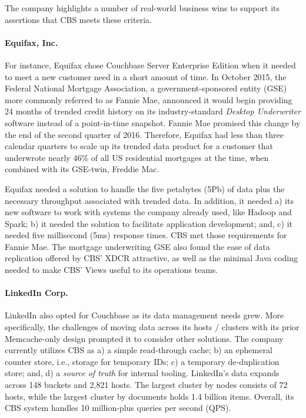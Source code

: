 \documentclass[9pt,twocolumn,twoside]{styles/osajnl}
\begin{document}
The company highlights a number of real-world business wins to support its
assertions that CBS meets these criteria.

\paragraph{Equifax, Inc.}
For instance, Equifax chose Couchbase
Server Enterprise Edition when it needed to meet a new customer need in a short
amount of time.  In October 2015, the Federal National Mortgage Association, a
government-sponsored entity (GSE) more commonly referred to as Fannie Mae,
announced it would begin providing 24 months of trended credit history on its
industry-standard \textit{Desktop Underwriter} software instead of a point-in-time snapshot.  Fannie Mae promised this change by the end of the second quarter of 2016.  Therefore, Equifax had less than three calendar quarters to scale up its trended data product for a customer that underwrote nearly 46\% of all US residential mortgages at the time, when combined with its GSE-twin, Freddie Mac.
\cite{www-trendeddata-equifax,www-gsemktshare-valuewalk}

Equifax needed a solution to handle the five petabytes (5Pb) of data plus the
necessary throughput associated with trended data.  In addition, it needed a)
its new software to work with systems the company already used, like Hadoop and
Spark; b) it needed the solution to facilitate application development; and, c)
it needed five millisecond (5ms) response times.  CBS met those requirements for
Fannie Mae.  The mortgage underwriting GSE also found the ease of data
replication offered by CBS' XDCR attractive, as well as the minimal Java coding
needed to make CBS' Views useful to its operations teams.
\cite{www-fanniemae-equifax-couchbaseconnect}

\paragraph{LinkedIn Corp.}
LinkedIn also opted for Couchbase as its data management needs grew.  More
specifically, the challenges of moving data across its hosts / clusters with its prior Memcache-only design prompted it to consider other solutions.  The company currently utilizes CBS as a) a simple read-through cache; b) an ephemeral counter store, i.e., storage for temporary IDs; c) a temporary de-duplication store; and, d) a \textit{source of truth} for internal tooling.  LinkedIn's data expands across 148 buckets and 2,821 hosts.  The largest cluster by nodes consists of 72 hosts, while the largest cluster by documents holds 1.4 billion items.  Overall, its CBS system handles 10 million-plus queries per second (QPS). \cite{www-linkedin-couchbaseconnect}
\end{document}
